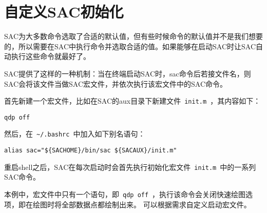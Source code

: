 \section{自定义SAC初始化}
SAC为大多数命令选取了合适的默认值，但有些时候命令的默认值并不是我们想要的，所以需要在SAC中执行命令并选取合适的值。如果能够在启动SAC时让SAC自动执行这些命令就最好了。

SAC提供了这样的一种机制：当在终端启动SAC时，sac命令后若接文件名，则SAC会将该文件当做SAC宏文件，并依次执行该宏文件中的SAC命令。

首先新建一个宏文件，比如在SAC的aux目录下新建文件~\verb+init.m+~，其内容如下：
\begin{verbatim}
qdp off
\end{verbatim}

然后，在~\verb+~/.bashrc+~中加入如下别名语句：
\begin{verbatim}
alias sac="${SACHOME}/bin/sac ${SACAUX}/init.m"
\end{verbatim}

重启shell之后，SAC在每次启动时会首先执行初始化宏文件~\verb+init.m+~中的一系列SAC命令。

本例中，宏文件中只有一个语句，即~\verb+qdp off+~，执行该命令会关闭快速绘图选项，即在绘图时将全部数据点都绘制出来。
可以根据需求自定义启动宏文件。
